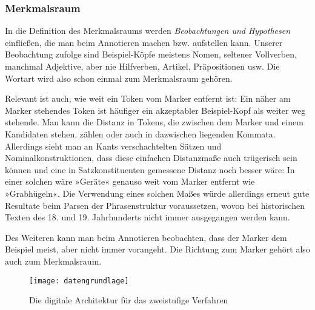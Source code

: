 \documentclass{article}
\begin{document}
\subsubsection{Merkmalsraum}

In die Definition des Merkmalsraums werden \emph{Beobachtungen und
  Hypothesen} einfließen, die man beim Annotieren machen
bzw. aufstellen kann. Unserer Beobachtung zufolge sind Beispiel-Köpfe
meistens Nomen, seltener Vollverben, manchmal Adjektive, aber nie
Hilfverben, Artikel, Präpositionen usw. Die Wortart wird also schon
einmal zum Merkmalsraum gehören.

Relevant ist auch, wie weit ein Token vom Marker entfernt ist: Ein
näher am Marker stehendes Token ist häufiger ein akzeptabler
Beispiel-Kopf als weiter weg stehende. Man kann die Distanz in Tokens,
die zwischen dem Marker und einem Kandidaten stehen, zählen oder auch
in dazwischen liegenden Kommata. Allerdings sieht man an Kants
verschachtelten Sätzen und Nominalkonstruktionen, dass diese einfachen
Distanzmaße auch trügerisch sein können und eine in Satzkonstituenten
gemessene Distanz noch besser wäre: In einer solchen wäre »Geräte«
genauso weit vom Marker entfernt wie »Grabhügeln«. Die Verwendung
eines solchen Maßes würde allerdings erneut gute Resultate beim Parsen
der Phrasenstruktur voraussetzen, wovon bei historischen Texten des
18. und 19. Jahrhunderts nicht immer ausgegangen werden kann.  

Des Weiteren kann man beim Annotieren beobachten, dass der Marker dem
Beispiel meist, aber nicht immer vorangeht. Die Richtung zum Marker
gehört also auch zum Merkmalsraum.

\begin{figure}[t]
  \ttfamily
  \texttt{[image: datengrundlage]}
  \caption{Die digitale Architektur für das zweistufige Verfahren}
  \label{fig:Architektur}
\end{figure}

\afterpage{\clearpage}
\end{document}
